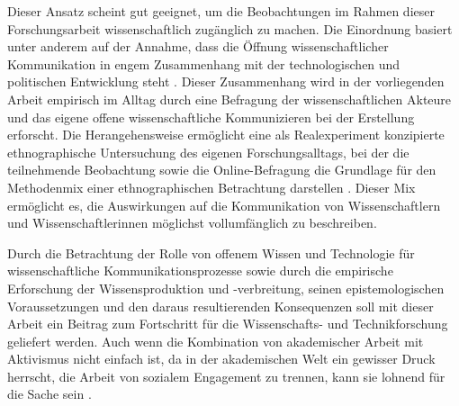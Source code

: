 Dieser Ansatz scheint gut geeignet, um die Beobachtungen im Rahmen dieser Forschungsarbeit wissenschaftlich zugänglich zu machen. Die Einordnung basiert unter anderem auf der Annahme, dass die Öffnung wissenschaftlicher Kommunikation in engem Zusammenhang mit der technologischen und politischen Entwicklung steht \cite{Weingart_2005}. Dieser Zusammenhang wird in der vorliegenden Arbeit empirisch im Alltag durch eine Befragung der wissenschaftlichen Akteure und das eigene offene wissenschaftliche Kommunizieren bei der Erstellung erforscht. Die Herangehensweise ermöglicht eine als Realexperiment konzipierte ethnographische Untersuchung des eigenen Forschungsalltags, bei der die teilnehmende Beobachtung sowie die Online-Befragung die Grundlage für den Methodenmix einer ethnographischen Betrachtung darstellen \cite{Bachmann_2011}. Dieser Mix ermöglicht es, die Auswirkungen auf die Kommunikation von Wissenschaftlern und Wissenschaftlerinnen möglichst vollumfänglich zu beschreiben.

Durch die Betrachtung der Rolle von offenem Wissen und Technologie für wissenschaftliche Kommunikationsprozesse sowie durch die empirische Erforschung der Wissensproduktion und -verbreitung, seinen epistemologischen Voraussetzungen und den daraus resultierenden Konsequenzen \cite[:12]{Beck_2014} soll mit dieser Arbeit ein Beitrag zum Fortschritt für die Wissenschafts- und Technikforschung geliefert werden. Auch wenn die Kombination von akademischer Arbeit mit Aktivismus nicht einfach ist, da in der akademischen Welt ein gewisser Druck herrscht, die Arbeit von sozialem Engagement zu trennen, kann sie lohnend für die Sache sein \cite[:25]{Flood_2013}.
